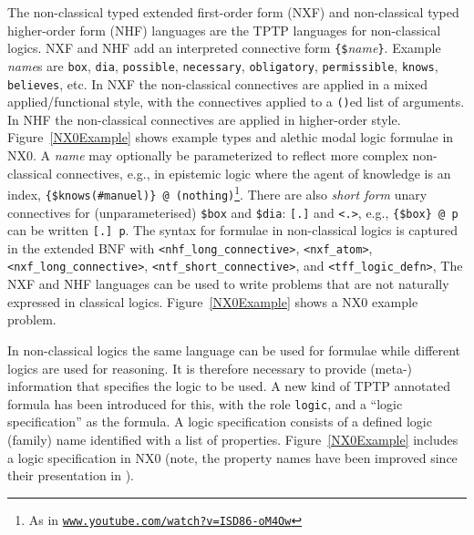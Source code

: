 \documentclass[runningheads]{llncs}
\begin{document}
The non-classical typed extended first-order form (NXF) and non-classical typed higher-order 
form (NHF) languages are the TPTP languages for non-classical logics.
NXF and NHF add an interpreted connective form
{\tt \verb|{|\$}{\em name}{\tt \verb|}|}.
Example {\em name}s are {\tt box}, {\tt dia}, {\tt possible}, {\tt necessary},
{\tt obligatory}, {\tt permissible}, {\tt knows}, {\tt believes}, etc.
In NXF the non-classical connectives are applied in a mixed applied/functional style, with the 
connectives applied to a {\tt ()}ed list of arguments.
In NHF the non-classical connectives are applied in higher-order style.
Figure~\ref{NX0Example} shows example types and alethic modal logic formulae in NX0.
A {\em name} may optionally be parameterized to reflect more complex non-classical connectives, 
e.g., in epistemic logic where the agent of knowledge is an index,
{\tt \verb|{|\$knows(\#manuel)\verb|}| @ (nothing)}\footnote{%
As in 
\href{https://www.youtube.com/watch?v=ISD86-oM4Ow}{\tt www.youtube.com/watch?v=ISD86-oM4Ow}}.
There are also {\em short form} unary connectives for (unparameterised) {\tt \$box} and 
{\tt \$dia}: {\tt [.]} and {\tt <.>}, e.g., {\tt \verb|{|\$box\verb|}| @ p} can be written 
{\tt [.] p}.
The syntax for formulae in non-classical logics is captured in the extended BNF with
{\tt <nhf\_long\_connective>}, {\tt <nxf\_atom>}, {\tt <nxf\_long\_connective>},
{\tt <ntf\_short\_connective>}, and {\tt <tff\_logic\_defn>},
The NXF and NHF languages can be used to write problems that are not naturally expressed in
classical logics.
Figure~\ref{NX0Example} shows a NX0 example problem.

In non-classical logics the same language can be used for formulae while different logics are 
used for reasoning.
It is therefore necessary to provide \mbox{(meta-)} information that specifies the
logic to be used.
A new kind of TPTP annotated formula has been introduced for this, with the role \texttt{logic},
and a ``logic specification'' as the formula.
A logic specification consists of a defined logic (family) name identified with a list of 
properties.
Figure~\ref{NX0Example} includes a logic specification in NX0 (note, the property names have
been improved since their presentation in \cite{SF+22}).
\end{document}

